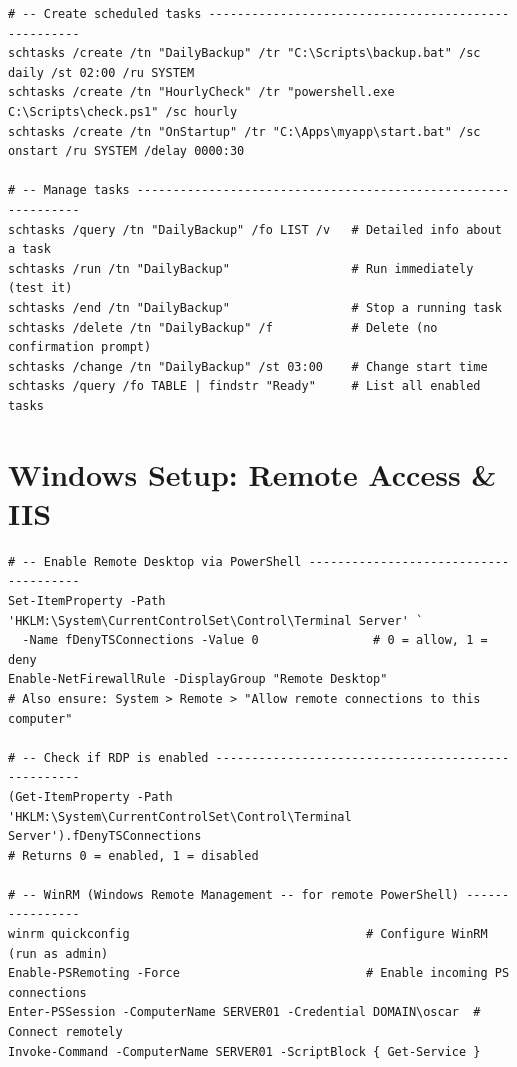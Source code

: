 \documentclass[11pt, letterpaper]{article}
\begin{document}
\begin{lstlisting}[style=shell, caption={Scheduled Tasks (schtasks.exe -- works in cmd and PowerShell)}]
# -- Create scheduled tasks ----------------------------------------------------
schtasks /create /tn "DailyBackup" /tr "C:\Scripts\backup.bat" /sc daily /st 02:00 /ru SYSTEM
schtasks /create /tn "HourlyCheck" /tr "powershell.exe C:\Scripts\check.ps1" /sc hourly
schtasks /create /tn "OnStartup" /tr "C:\Apps\myapp\start.bat" /sc onstart /ru SYSTEM /delay 0000:30

# -- Manage tasks --------------------------------------------------------------
schtasks /query /tn "DailyBackup" /fo LIST /v   # Detailed info about a task
schtasks /run /tn "DailyBackup"                 # Run immediately (test it)
schtasks /end /tn "DailyBackup"                 # Stop a running task
schtasks /delete /tn "DailyBackup" /f           # Delete (no confirmation prompt)
schtasks /change /tn "DailyBackup" /st 03:00    # Change start time
schtasks /query /fo TABLE | findstr "Ready"     # List all enabled tasks
\end{lstlisting}

\section*{Windows Setup: Remote Access \& IIS}

\begin{lstlisting}[style=shell, caption={Remote Desktop and WinRM configuration}]
# -- Enable Remote Desktop via PowerShell --------------------------------------
Set-ItemProperty -Path 'HKLM:\System\CurrentControlSet\Control\Terminal Server' `
  -Name fDenyTSConnections -Value 0                # 0 = allow, 1 = deny
Enable-NetFirewallRule -DisplayGroup "Remote Desktop"
# Also ensure: System > Remote > "Allow remote connections to this computer"

# -- Check if RDP is enabled ---------------------------------------------------
(Get-ItemProperty -Path 'HKLM:\System\CurrentControlSet\Control\Terminal Server').fDenyTSConnections
# Returns 0 = enabled, 1 = disabled

# -- WinRM (Windows Remote Management -- for remote PowerShell) ----------------
winrm quickconfig                                 # Configure WinRM (run as admin)
Enable-PSRemoting -Force                          # Enable incoming PS connections
Enter-PSSession -ComputerName SERVER01 -Credential DOMAIN\oscar  # Connect remotely
Invoke-Command -ComputerName SERVER01 -ScriptBlock { Get-Service }
\end{lstlisting}
\end{document}
